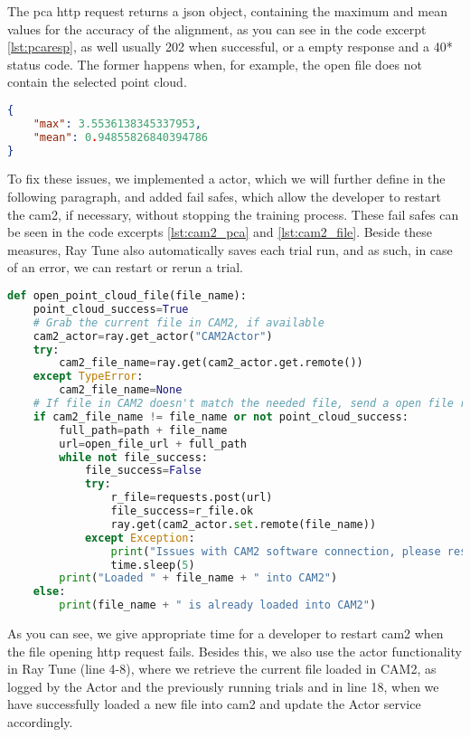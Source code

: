 The \acrshort{pca} \acrshort{http} request returns a \acrshort{json} object, containing the maximum and mean values for the accuracy of the alignment, as you can see in the code excerpt \ref{lst:pcaresp}, as well  usually 202 when successful, or a empty response and a 40* status code. The former happens when, for example, the open file does not contain the selected point cloud.

\begin{lstlisting}[language=json, caption=Example \acrshort{pca} \acrshort{http} request response, captionpos=b, label={lst:pcaresp}]
{
    "max": 3.5536138345337953,
    "mean": 0.94855826840394786
}
\end{lstlisting}

To fix these issues, we implemented a actor, which we will further define in the following paragraph, and added fail safes, which allow the developer to restart the \acrshort{cam2}, if necessary, without stopping the training process. These fail safes can be seen in the code excerpts \ref{lst:cam2_pca} and \ref{lst:cam2_file}. Beside these measures, Ray Tune also automatically saves each trial run, and as such, in case of an error, we can restart or rerun a trial.

\begin{lstlisting}[language=Python, caption=Opening a \acrshort{fcd} file in \acrshort{cam2}, captionpos=b, label={lst:cam2_pca}]
def open_point_cloud_file(file_name):
    point_cloud_success=True
    # Grab the current file in CAM2, if available
    cam2_actor=ray.get_actor("CAM2Actor")
    try:
        cam2_file_name=ray.get(cam2_actor.get.remote())
    except TypeError:
        cam2_file_name=None
    # If file in CAM2 doesn't match the needed file, send a open file request
    if cam2_file_name != file_name or not point_cloud_success:
        full_path=path + file_name
        url=open_file_url + full_path
        while not file_success:
            file_success=False
            try:
                r_file=requests.post(url)
                file_success=r_file.ok
                ray.get(cam2_actor.set.remote(file_name))
            except Exception:
                print("Issues with CAM2 software connection, please restart the CAM2 software.")
                time.sleep(5)
        print("Loaded " + file_name + " into CAM2")
    else:
        print(file_name + " is already loaded into CAM2")
\end{lstlisting}

As you can see, we give appropriate time for a developer to restart \acrshort{cam2} when the file opening \acrshort{http} request fails. Besides this, we also use the actor functionality in Ray Tune (line 4-8), where we retrieve the current file loaded in CAM2, as logged by the Actor and the previously running trials and in line 18, when we have successfully loaded a new file into \acrshort{cam2} and update the Actor service accordingly.

